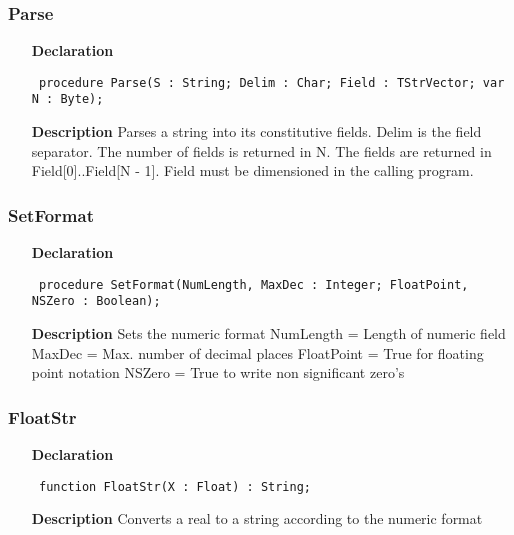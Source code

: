 \documentclass[12pt,a4paper,oneside]{report}
\newcommand{\declarationitem}[1]{\textbf{#1}}
\newcommand{\descriptiontitle}[1]{\textbf{#1}}
\newcommand{\code}[1]{\texttt{#1}}
\begin{document}
\subsubsection{Parse}
\label{ustrings-Parse}
\begin{itemize}\item[\declarationitem{Declaration}\hfill]
	\begin{flushleft}
		\code{
			procedure Parse(S : String; Delim : Char; Field : TStrVector; var N : Byte);}
		
	\end{flushleft}
	
	\par
	\item[\descriptiontitle{Description}]
	Parses a string into its constitutive fields. Delim is the field separator. The number of fields is returned in N. The fields are returned in Field[0]..Field[N {-} 1]. Field must be dimensioned in the calling program.
	
\end{itemize}
\subsubsection{SetFormat}
\label{ustrings-SetFormat}
\begin{itemize}\item[\declarationitem{Declaration}\hfill]
	\begin{flushleft}
		\code{
			procedure SetFormat(NumLength, MaxDec : Integer; FloatPoint, NSZero : Boolean);}
		
	\end{flushleft}
	
	\par
	\item[\descriptiontitle{Description}]
	Sets the numeric format NumLength = Length of numeric field MaxDec = Max. number of decimal places FloatPoint = True for floating point notation NSZero = True to write non significant zero's
	
\end{itemize}
\subsubsection{FloatStr}
\label{ustrings-FloatStr}
\begin{itemize}\item[\declarationitem{Declaration}\hfill]
	\begin{flushleft}
		\code{
			function FloatStr(X : Float) : String;}
		
	\end{flushleft}
	
	\par
	\item[\descriptiontitle{Description}]
	Converts a real to a string according to the numeric format
	
\end{itemize}
\end{document}
